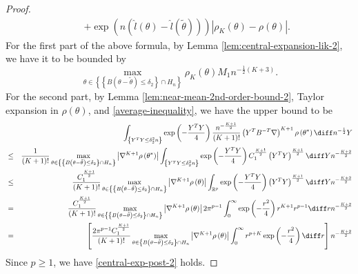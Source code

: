\begin{proof}
\begin{eqnarray*}
 &  & +\exp\left(n\left(\hat{l}\left(\theta\right)-\hat{l}\left(\tilde{\theta}\right)\right)\right)\left|\rho_{K}\left(\theta\right)-\rho\left(\theta\right)\right|.
\end{eqnarray*}
For the first part of the above formula, by Lemma \ref{lem:central-expansion-lik-2},
we have it to be bounded by 
\[
\max_{\theta\in\left\{ \left\{ B\left(\theta-\tilde{\theta}\right)\le\delta_{2}\right\} \cap H_{n}\right\} }\rho_{K}\left(\theta\right)M_{1}n^{-\frac{1}{2}\left(K+3\right)}.
\]
For the second part, by Lemma \ref{lem:near-mean-2nd-order-bound-2}, Taylor
expansion in $\rho\left(\theta\right)$, and \eqref{average-inequality},
we have the upper bound to be 
\begin{eqnarray*}
 &  & \int_{\left\{ Y^{T}Y\le\delta_{2}^{2}n\right\} }\exp\left(-\frac{Y^{T}Y}{4}\right)\frac{n^{-\frac{K+1}{2}}}{\left(K+1\right)!}\left(Y^{T}B^{-T}\nabla\right)^{K+1}\rho\left(\theta^{*}\right)\diff n^{-\frac{1}{2}}Y\\
 & \le & \frac{1}{\left(K+1\right)!}\max_{\theta\in\left\{ \left\{ B\left(\theta-\tilde{\theta}\right)\le\delta_{2}\right\} \cap H_{n}\right\} }\left|\nabla^{K+1}\rho\left(\theta^{*}\right)\right|\int_{\left\{ Y^{T}Y\le\delta_{2}^{2}n\right\} }\exp\left(-\frac{Y^{T}Y}{4}\right)C_{1}^{\frac{K+1}{2}}\left(Y^{T}Y\right)^{\frac{K+1}{2}}\diff Yn^{-\frac{K+2}{2}}\\
 & \le & \frac{C_{1}^{\frac{K+1}{2}}}{\left(K+1\right)!}\max_{\theta\in\left\{ \left\{ B\left(\theta-\tilde{\theta}\right)\le\delta_{2}\right\} \cap H_{n}\right\} }\left|\nabla^{K+1}\rho\left(\theta\right)\right|\int_{\mathbb{R}^{p}}\exp\left(-\frac{Y^{T}Y}{4}\right)\left(Y^{T}Y\right)^{\frac{K+1}{2}}\diff Yn^{-\frac{K+2}{2}}\\
 & = & \frac{C_{1}^{\frac{K+1}{2}}}{\left(K+1\right)!}\max_{\theta\in\left\{ \left\{ B\left(\theta-\tilde{\theta}\right)\le\delta_{2}\right\} \cap H_{n}\right\} }\left|\nabla^{K+1}\rho\left(\theta\right)\right|2\pi^{p-1}\int_{0}^{\infty}\exp\left(-\frac{r^{2}}{4}\right)r^{K+1}r^{p-1}\diff rn^{-\frac{K+2}{2}}\\
 & = & \left[\frac{2\pi^{p-1}C_{1}^{\frac{K+1}{2}}}{\left(K+1\right)!}\max_{\theta\in\left\{ B\left(\theta-\tilde{\theta}\right)\le\delta_{2}\right\} \cap H_{n}}\left|\nabla^{K+1}\rho\left(\theta\right)\right|\int_{0}^{\infty}r^{p+K}\exp\left(-\frac{r^{2}}{4}\right)\diff r\right]n^{-\frac{K+2}{2}}
\end{eqnarray*}
Since $p\ge1$, we have \eqref{central-exp-post-2} holds.

\end{proof}

